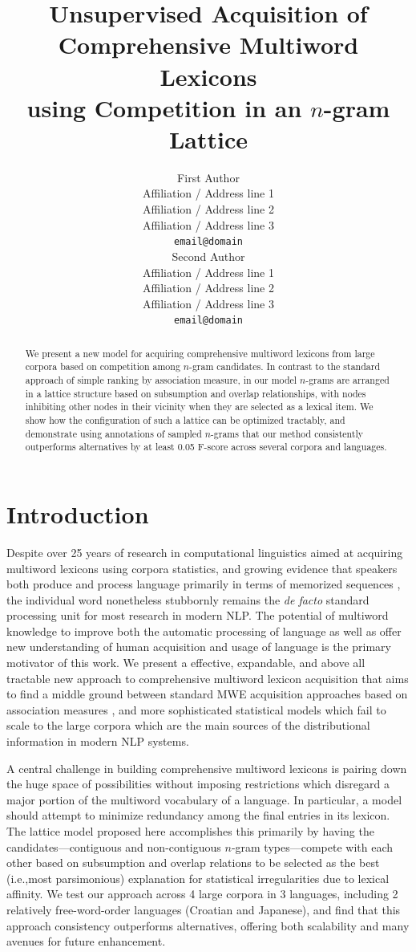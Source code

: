 \documentclass[11pt,letterpaper]{article}
\title{Unsupervised Acquisition of Comprehensive Multiword Lexicons \\ using Competition in an $n$-gram Lattice}
\author{First Author \\
  Affiliation / Address line 1 \\
  Affiliation / Address line 2 \\
  Affiliation / Address line 3 \\
  {\tt email@domain} \\\And
  Second Author \\
  Affiliation / Address line 1 \\
  Affiliation / Address line 2 \\
  Affiliation / Address line 3 \\
  {\tt email@domain} \\}
\date{}
\makeatletter
\def \ie {i.e.,\@ }
\makeatother
\begin{document}
\maketitle


\begin{abstract}
We present a new model for acquiring comprehensive multiword lexicons from large corpora based on  competition among $n$-gram candidates. In contrast to the standard approach of simple ranking by association measure, in our model $n$-grams are arranged in a lattice structure based on subsumption and overlap relationships, with nodes inhibiting other nodes in their vicinity when they are selected as a lexical item. We show how the configuration of such a lattice can be optimized tractably, and demonstrate using annotations of sampled $n$-grams that our method consistently outperforms alternatives by at least 0.05 F-score across several corpora and languages.
\end{abstract}


\section{Introduction}

Despite over 25 years of research in computational linguistics aimed at acquiring multiword lexicons using corpora statistics, and growing evidence that speakers both produce and process language primarily in terms of memorized sequences \cite{Wray08}, the individual word nonetheless stubbornly remains the \textit{de facto} standard processing unit for most research in modern NLP. The potential of multiword knowledge to improve both the automatic processing of language as well as offer new understanding of human acquisition and usage of language is the primary motivator of this work. We present a effective, expandable, and above all tractable new approach to comprehensive multiword lexicon acquisition that aims to find a middle ground between standard MWE acquisition approaches based on association measures \cite{Ramisch14}, and more sophisticated statistical models \cite{Newman12} which fail to scale to the large corpora which are the main sources of the distributional information in modern NLP systems.

A central challenge in building comprehensive multiword lexicons is pairing down the huge space of possibilities without imposing restrictions which disregard a major portion of the multiword vocabulary of a language. In particular, a model should attempt to minimize redundancy among the final entries in its lexicon. The lattice model proposed here accomplishes this primarily by having the candidates---contiguous and non-contiguous $n$-gram types---compete with each other based on subsumption and overlap relations to be selected as the best (\ie most parsimonious) explanation for statistical irregularities due to lexical affinity. We test our approach across 4 large corpora in 3 languages, including 2 relatively free-word-order languages (Croatian and Japanese), and find that this approach consistency outperforms alternatives, offering both scalability and many avenues for future enhancement.
\end{document}
